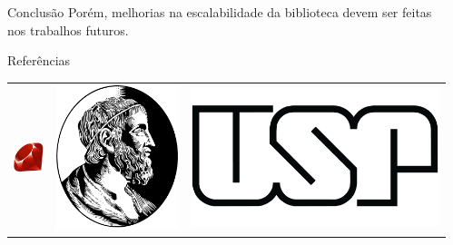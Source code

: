 \documentclass[final]{beamer}
\newlength{\sepwid}
\newlength{\onecolwid}
\begin{document}
\begin{frame}[t]
\begin{columns}[t]
\begin{column}{\onecolwid}
\begin{block}{Conclusão}
Porém, melhorias na escalabilidade da biblioteca devem ser feitas nos trabalhos futuros.

\end{block}


\begin{block}{Referências}

\nocite{*} %
\small{
}

\end{block}


\begin{center}
\begin{tabular}{ccc}
\includegraphics[width=0.12\linewidth]{ruby.png} & \includegraphics[width=0.12\linewidth]{IME.png} & \includegraphics[width=0.25\linewidth]{USP.jpg}
\end{tabular}
\end{center}


\end{column} %

\begin{column}{\sepwid}\end{column} %

\end{columns} %

\end{frame} %
\end{document}
